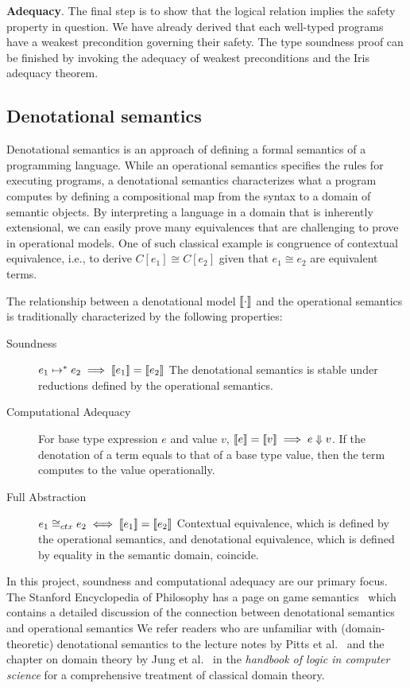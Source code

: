 \documentclass{article}
\theoremstyle{definition}
\theoremstyle{plain}
\theoremstyle{remark}
\newcommand{\redu}{\mapsto}
\begin{document}
\textbf{Adequacy}. The final step is to show that the logical relation implies the safety property in question.
We have already derived that each well-typed programs have a weakest precondition governing their safety.
The type soundness proof can be finished by invoking the adequacy of weakest preconditions and the Iris adequacy theorem.

\subsection{Denotational semantics}

Denotational semantics is an approach of defining a formal semantics of a programming language.
While an operational semantics specifies the rules for executing programs, a denotational semantics characterizes what a program computes by defining a compositional map from the syntax to a domain of semantic objects.
By interpreting a language in a domain that is inherently extensional, we can easily prove many equivalences that are challenging to prove in operational models.
One of such classical example is congruence of contextual equivalence, i.e., to derive \(C[e_1] \cong C[e_2]\) given that \(e_1\cong e_2\) are equivalent terms.\par

The relationship between a denotational model \(\llbracket {\cdot} \rrbracket\) and the operational semantics is traditionally characterized by the following properties:

\begin{description}
  \item[Soundness] \(e_1 \redu^* e_2 \implies \sem{e_1} = \sem{e_2}\)
    The denotational semantics is stable under reductions defined by the operational semantics.
  \item[Computational Adequacy] For base type expression \(e\) and value \(v\), \(\llbracket {e} \rrbracket = \llbracket {v} \rrbracket \implies e \Downarrow v\).
    If the denotation of a term equals to that of a base type value, then the term computes to the value operationally.
  \item[Full Abstraction] \(e_1 \cong_{ctx} e_2 \iff \llbracket {e_1} \rrbracket = \llbracket {e_2} \rrbracket\)
    Contextual equivalence, which is defined by the operational semantics, and denotational equivalence, which is defined by equality in the semantic domain, coincide.
\end{description}

In this project, soundness and computational adequacy are our primary focus.
The Stanford Encyclopedia of Philosophy has a page on game semantics~\cite{sep-games-abstraction} which contains a detailed discussion of the connection between denotational semantics and operational semantics
We refer readers who are unfamiliar with (domain-theoretic) denotational semantics to the lecture notes by Pitts et al.~\cite{den-lectures} and the chapter on domain theory by Jung et al.~\cite{jung1996domains} in the \emph{handbook of logic in computer science} for a comprehensive treatment of classical domain theory.
\end{document}
